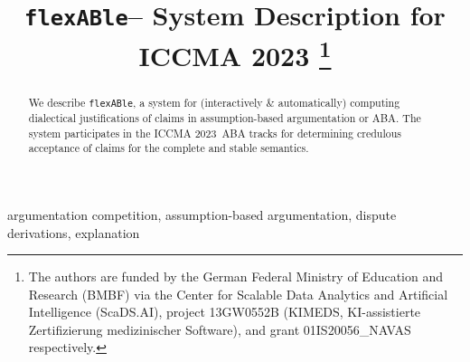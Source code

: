 \documentclass[conference]{IEEEtran}
\newcommand{\flexable}{\texttt{flexABle}\xspace}
\newcommand{\iccma}{ICCMA 2023}
\begin{document}
\title{\flexable -- System Description for \iccma
  \thanks{The authors are funded by the German Federal Ministry of Education and Research (BMBF) via the Center for Scalable Data Analytics and Artificial Intelligence (ScaDS.AI), project 13GW0552B (KIMEDS, KI-assistierte Zertifizierung medizinischer Software), and grant  01IS20056\_NAVAS respectively.     }
}


\author{
\and    
{}
\and
{}
}





\maketitle

\begin{abstract} We describe \flexable, a system for (interactively \& automatically) computing dialectical justifications of claims in assumption-based argumentation or ABA.  The system participates in the \iccma~ABA tracks for determining credulous acceptance of claims for the complete and stable semantics.      
\end{abstract}

\begin{IEEEkeywords}
argumentation competition, assumption-based argumentation, dispute derivations, explanation
\end{IEEEkeywords}
\end{document}
